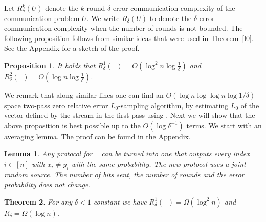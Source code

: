 \documentclass[9pt,letterpaper]{article}
\newtheorem{lemma}{Lemma}
\newtheorem{theorem}{Theorem}
\newtheorem{proposition}[theorem]{Proposition}
\theoremstyle{remark}
\DeclareMathOperator{\URn}{UR^n}
\begin{document}
Let $R^k_\delta(U)$ denote the $k$-round $\delta$-error communication
complexity of the communication problem $U$. We write $R_\delta(U)$ to denote
the $\delta$-error communication complexity when the number of rounds is not
bounded. The following proposition follows from similar ideas that were used in 
Theorem~\ref{l0}. See the Appendix for a sketch of the proof.

\begin{proposition}\label{thm:urub}
It holds that $R^1_\delta(\URn)=O(\log^2 n\log\frac{1}{\delta})$ and $R^2_\delta(\URn)=O(\log n\log\frac{1}{\delta})$.
\end{proposition}

We remark that along similar lines one can find an $O(\log n \log\log n\log1/\delta )$
space two-pass zero relative error $L_0$-sampling algorithm, by estimating  $L_0$ 
of the vector defined by the stream in the first pass using \cite{KaneNW10}. Next
 we will show that the above proposition is best possible up to the $O(\log\delta^{-1})$
terms. We start with an averaging lemma. The proof can be found in the Appendix.


\begin{lemma}\label{aver} Any protocol for $\URn$ can be turned into one that
outputs every index $i\in[n]$ with $x_i\ne y_i$ with the same probability. The
new protocol uses a joint random source. The number of bits sent, the number
of rounds and the error probability does not change.
\end{lemma}


\begin{theorem}\label{thm:urlb}
For any $\delta<1$ constant we have $R^1_\delta(\URn)=\Omega(\log^2 n)$ and
$R_\delta=\Omega(\log n)$.
\end{theorem}
\end{document}
